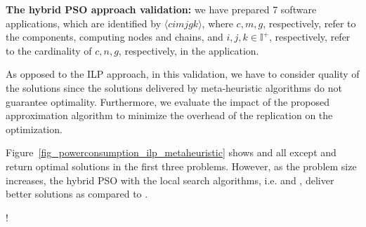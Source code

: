 \noindent\textbf{The hybrid PSO approach validation: } we have prepared 7 software applications, which are identified by $\langle cimjgk\rangle$, where $c,m,g$, respectively, refer to the components, computing nodes and chains, and $i,j,k\in\mathbb{I}^+$, respectively, refer to the cardinality of $c,n,g$, respectively, in the application.

As opposed to the ILP approach, in this validation, we have to consider quality of the solutions since the solutions delivered by meta-heuristic algorithms do not guarantee optimality. Furthermore, we evaluate the impact of the proposed approximation algorithm to minimize the overhead of the replication on the optimization. 

Figure~\ref{fig_powerconsumption_ilp_metaheuristic} shows \ilp{} and all except \pso{} and \depso{} return optimal solutions in the first three problems. However, as the problem size increases, the hybrid PSO with the local search algorithms, i.e. \hcpso{} and \shpso{}, deliver better solutions as compared to \depso{}. 
\begin{center}
 {!} {
}
\end{center}

